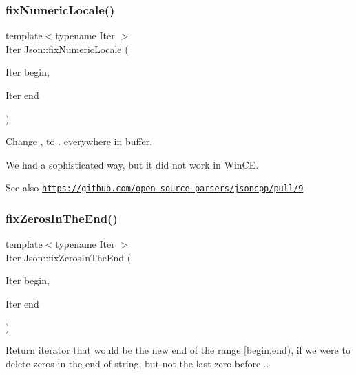 \subsubsection{\texorpdfstring{fix\+Numeric\+Locale()}{fixNumericLocale()}}
{\footnotesize\ttfamily template$<$typename Iter $>$ \\
Iter Json\+::fix\+Numeric\+Locale (\begin{DoxyParamCaption}\item[{Iter}]{begin,  }\item[{Iter}]{end }\end{DoxyParamCaption})}

Change \textquotesingle{},\textquotesingle{} to \textquotesingle{}.\textquotesingle{} everywhere in buffer.

We had a sophisticated way, but it did not work in Win\+CE. \begin{DoxySeeAlso}{See also}
\href{https://github.com/open-source-parsers/jsoncpp/pull/9}{\tt https\+://github.\+com/open-\/source-\/parsers/jsoncpp/pull/9} 
\end{DoxySeeAlso}
\mbox{\label{namespaceJson_ae7b26e19e40cb18a11568cb477ff1743}} 
\subsubsection{\texorpdfstring{fix\+Zeros\+In\+The\+End()}{fixZerosInTheEnd()}}
{\footnotesize\ttfamily template$<$typename Iter $>$ \\
Iter Json\+::fix\+Zeros\+In\+The\+End (\begin{DoxyParamCaption}\item[{Iter}]{begin,  }\item[{Iter}]{end }\end{DoxyParamCaption})}

Return iterator that would be the new end of the range \mbox{[}begin,end), if we were to delete zeros in the end of string, but not the last zero before \textquotesingle{}.\textquotesingle{}. \mbox{\label{namespaceJson_a677dd20047c0c6e4eb16c5f1b53f703c}} 
